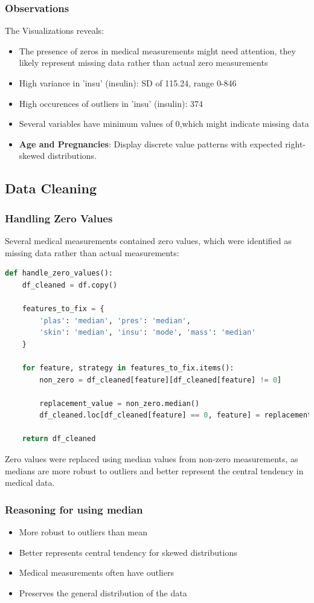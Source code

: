 \documentclass[a4paper,12pt]{article}
\begin{document}
\subsubsection{Observations}
The Visualizations reveals:
\begin{itemize}
    \item{The presence of zeros in medical measurements might need attention, they likely represent missing data rather than actual zero measurements}
    \item{High variance in 'insu' (insulin): SD of 115.24, range 0-846}
    \item{High occurences of outliers in 'insu' (insulin): 374}
    \item{Several variables have minimum values of 0,which might indicate missing data}
    \item \textbf{Age and Pregnancies}: Display discrete value patterns with expected right-skewed distributions.
\end{itemize}

\subsection{Data Cleaning}
\subsubsection{Handling Zero Values}
Several medical measurements contained zero values, which were identified as missing data rather than actual measurements:

\begin{lstlisting}[language=Python, style=python]
def handle_zero_values():
    df_cleaned = df.copy()

    features_to_fix = {
        'plas': 'median', 'pres': 'median',
        'skin': 'median', 'insu': 'mode', 'mass': 'median'
    }

    for feature, strategy in features_to_fix.items():
        non_zero = df_cleaned[feature][df_cleaned[feature] != 0]

        replacement_value = non_zero.median()
        df_cleaned.loc[df_cleaned[feature] == 0, feature] = replacement_value

    return df_cleaned
\end{lstlisting}
Zero values were replaced using median values from non-zero measurements, as medians are more robust to outliers and better represent the central tendency in medical data.

\subsubsection*{Reasoning for using median}
\begin{itemize}
    \item{More robust to outliers than mean}
    \item{Better represents central tendency for skewed distributions}
    \item{Medical measurements often have outliers}
    \item{Preserves the general distribution of the data}
\end{itemize}
\end{document}

